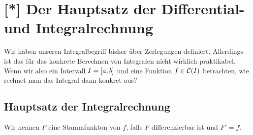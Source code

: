 \section{[*] Der Hauptsatz der Differential- und Integralrechnung}
\thispagestyle{pagenumberonly}

Wir haben unseren Integralbegriff bisher über Zerlegungen definiert. Allerdings ist das für das konkrete Berechnen von Integralen nicht wirklich praktikabel. Wenn wir also ein Intervall $I=\left[a,b\right]$ und eine Funktion $f\in\mC\of{I}$ betrachten, wie rechnet man das Integral dann konkret aus?

\subsection{Hauptsatz der Integralrechnung}

\begin{definition}
    Wir nennen $F$ eine Stammfunkton von $f$, falls $F$ differenzierbar ist und $F'=f$.
\end{definition}

